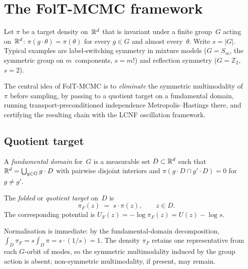 %  

\section{The FolT-MCMC framework}
\label{sec:framework}

Let $\pi$ be a target density on~$\mathbb{R}^d$ that is invariant under a
finite group~$G$ acting on~$\mathbb{R}^d$: $\pi(g \cdot \theta) = \pi(\theta)$
for every $g \in G$ and almost every~$\theta$.  Write $s = |G|$.
Typical examples are label-switching symmetry in mixture models
($G = S_m$, the symmetric group on $m$~components, $s = m!$) and
reflection symmetry ($G = \mathbb{Z}_2$, $s = 2$).

The central idea of FolT-MCMC is to \emph{eliminate} the symmetric
multimodality of~$\pi$ before sampling, by passing to a quotient
target on a fundamental domain, running transport-preconditioned
independence Metropolis--Hastings there, and certifying the resulting
chain with the LCNF oscillation framework.


\subsection{Quotient target}
\label{sec:quotient_target}

A \emph{fundamental domain} for~$G$ is a measurable set
$D \subset \mathbb{R}^d$ such that $\mathbb{R}^d = \bigcup_{g \in G} g \cdot D$
with pairwise disjoint interiors and
$\pi(g \cdot D \cap g' \cdot D) = 0$ for $g \neq g'$.

\begin{definition}\label{def:quotient_target}
  The \emph{folded} or \emph{quotient target} on~$D$ is
  \begin{equation}\label{eq:pi_F}
    \pi_F(z) \;=\; s \cdot \pi(z), \qquad z \in D.
  \end{equation}
  The corresponding potential is
  $U_F(z) = -\log\pi_F(z) = U(z) - \log s$.
\end{definition}

\noindent
Normalisation is immediate: by the fundamental-domain decomposition,
$\int_D \pi_F = s \int_D \pi = s \cdot (1/s) = 1$.
The density $\pi_F$ retains one representative from each $G$-orbit
of modes, so the symmetric multimodality induced by the group action
is absent; non-symmetric multimodality, if present, may remain.

